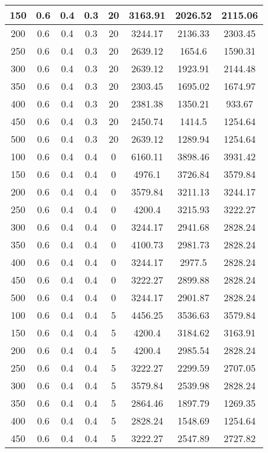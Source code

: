 \documentclass[a4paper, 12pt]{extreport}
\begin{document}
\begin{itemize}
\begin{longtable}{|c|c|c|c|c|c|c|c|}
			150 & 0.6 & 0.4 & 0.3 & 20 & 3163.91 & 2026.52 & 2115.06 \\\hline
			200 & 0.6 & 0.4 & 0.3 & 20 & 3244.17 & 2136.33 & 2303.45 \\\hline
			250 & 0.6 & 0.4 & 0.3 & 20 & 2639.12 & 1654.6 & 1590.31 \\\hline
			300 & 0.6 & 0.4 & 0.3 & 20 & 2639.12 & 1923.91 & 2144.48 \\\hline
			350 & 0.6 & 0.4 & 0.3 & 20 & 2303.45 & 1695.02 & 1674.97 \\\hline
			400 & 0.6 & 0.4 & 0.3 & 20 & 2381.38 & 1350.21 & 933.67 \\\hline
			450 & 0.6 & 0.4 & 0.3 & 20 & 2450.74 & 1414.5 & 1254.64 \\\hline
			500 & 0.6 & 0.4 & 0.3 & 20 & 2639.12 & 1289.94 & 1254.64 \\\hline
			100 & 0.6 & 0.4 & 0.4 & 0 & 6160.11 & 3898.46 & 3931.42 \\\hline
			150 & 0.6 & 0.4 & 0.4 & 0 & 4976.1 & 3726.84 & 3579.84 \\\hline
			200 & 0.6 & 0.4 & 0.4 & 0 & 3579.84 & 3211.13 & 3244.17 \\\hline
			250 & 0.6 & 0.4 & 0.4 & 0 & 4200.4 & 3215.93 & 3222.27 \\\hline
			300 & 0.6 & 0.4 & 0.4 & 0 & 3244.17 & 2941.68 & 2828.24 \\\hline
			350 & 0.6 & 0.4 & 0.4 & 0 & 4100.73 & 2981.73 & 2828.24 \\\hline
			400 & 0.6 & 0.4 & 0.4 & 0 & 3244.17 & 2977.5 & 2828.24 \\\hline
			450 & 0.6 & 0.4 & 0.4 & 0 & 3222.27 & 2899.88 & 2828.24 \\\hline
			500 & 0.6 & 0.4 & 0.4 & 0 & 3244.17 & 2901.87 & 2828.24 \\\hline
			100 & 0.6 & 0.4 & 0.4 & 5 & 4456.25 & 3536.63 & 3579.84 \\\hline
			150 & 0.6 & 0.4 & 0.4 & 5 & 4200.4 & 3184.62 & 3163.91 \\\hline
			200 & 0.6 & 0.4 & 0.4 & 5 & 4200.4 & 2985.54 & 2828.24 \\\hline
			250 & 0.6 & 0.4 & 0.4 & 5 & 3222.27 & 2299.59 & 2707.05 \\\hline
			300 & 0.6 & 0.4 & 0.4 & 5 & 3579.84 & 2539.98 & 2828.24 \\\hline
			350 & 0.6 & 0.4 & 0.4 & 5 & 2864.46 & 1897.79 & 1269.35 \\\hline
			400 & 0.6 & 0.4 & 0.4 & 5 & 2828.24 & 1548.69 & 1254.64 \\\hline
			450 & 0.6 & 0.4 & 0.4 & 5 & 3222.27 & 2547.89 & 2727.82 \\\hline

\end{longtable}
\end{itemize}
\end{document}

